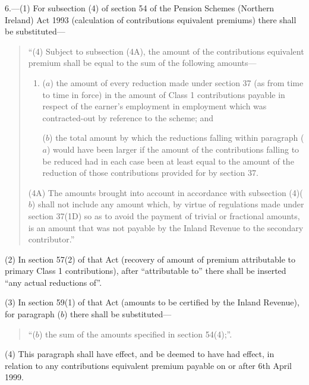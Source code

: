 \documentclass[12pt,a4paper]{article}
\begin{document}
6.---(1) For subsection (4)  of section 54 of the Pension Schemes (Northern Ireland) Act 1993 (calculation of contributions equivalent premiums) there shall be substituted—
\begin{quotation}
“(4) Subject to subsection (4A), the amount of the contributions equivalent premium shall be equal to the sum of the following amounts—
\begin{enumerate}\item[]
($a$) the amount of every reduction made under section 37 (as from time to time in force) in the amount of Class 1 contributions payable in respect of the earner’s employment in employment which was contracted-out by reference to the scheme; and

($b$) the total amount by which the reductions falling within paragraph ($a$)  would have been larger if the amount of the contributions falling to be reduced had in each case been at least equal to the amount of the reduction of those contributions provided for by section 37. 
\end{enumerate}

(4A) The amounts brought into account in accordance with subsection (4)($b$)  shall not include any amount which, by virtue of regulations made under section 37(1D) so as to avoid the payment of trivial or fractional amounts, is an amount that was not payable by the Inland Revenue to the secondary contributor.”
\end{quotation}

(2) In section 57(2)  of that Act (recovery of amount of premium attributable to primary Class 1 contributions), after “attributable to” there shall be inserted “any actual reductions of”.

(3) In section 59(1)  of that Act (amounts to be certified by the Inland Revenue), for paragraph ($b$)  there shall be substituted—
\begin{quotation}
“($b$) the sum of the amounts specified in section 54(4);”.
\end{quotation}

(4) This paragraph shall have effect, and be deemed to have had effect, in relation to any contributions equivalent premium payable on or after 6th April 1999. 

%

\end{document}
